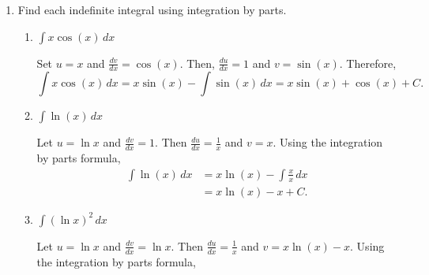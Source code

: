 \documentclass{article}
\begin{document}
\begin{enumerate}

\begin{grading}
Parts (a) and (bi) are direct applications of integration by parts. Part (bii) and (c) involve two applications but utilize previous computations.
\end{grading}


\item Find each indefinite integral using integration by parts.

\begin{enumerate}

\item 
\begin{problem}[\vfill]
    $\displaystyle \int x \cos(x)  \,dx $
\end{problem}

\begin{solution}
Set $u = x$ and $\frac{dv}{dx} = \cos(x)$. Then, $\frac{du}{dx} = 1$ and $v = \sin(x)$. Therefore,
\[\int x \cos(x) \,dx = x\sin(x) - \int \sin(x) \,dx = x\sin(x) + \cos(x) + C.\]
\end{solution}

    \item 
    \begin{problem}[\vfill] 
    $\displaystyle \int \ln(x)\, dx$
    \end{problem}

    \begin{solution}
    
    Let $u = \ln x$ and $\frac{dv}{dx} = 1$. 
    Then $\frac{du}{dx} = \frac{1}{x}$ and $v = x$.
    Using the integration by parts formula,
    \begin{align*}
    \int \ln(x) \, dx &= x\ln(x) - \int \frac{x}{x}\, dx \\
    &= x\ln(x) - x + C.
    \end{align*}
        
    \end{solution}

    \item
    \begin{problem}[\vfill\newpage]
    $\displaystyle \int (\ln x)^2 \, dx$
    \end{problem}

    \begin{solution}

    Let $u = \ln x$ and $\frac{dv}{dx} = \ln x$. Then
    $\frac{du}{dx} = \frac{1}{x}$ and $v = x\ln(x) - x$.
    Using the integration by parts formula,


\end{solution}
\end{enumerate}
\end{enumerate}
\end{document}
